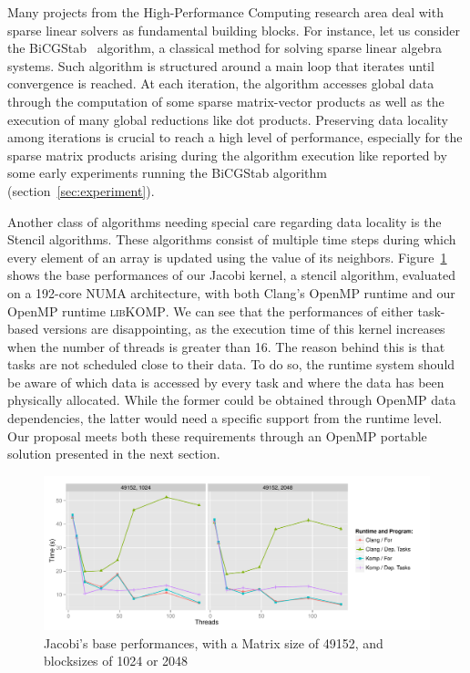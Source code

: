 \documentclass{Styles/llncs}
\newcommand{\libXKOMP}{\textsc{libKOMP}\xspace}
\begin{document}
Many projects from the High-Performance Computing research area deal with sparse linear solvers as fundamental building blocks.
For instance, let us consider the BiCGStab~\cite{Saad:2003:IMS:829576} algorithm, a classical method for solving sparse linear algebra systems.  Such algorithm is structured around a main loop that iterates until convergence is reached. At each iteration, the algorithm accesses global data through the computation of some sparse matrix-vector products as well as the execution of many global reductions like dot products. Preserving data locality among iterations is crucial to reach a high level of performance, especially for the sparse matrix products arising during the algorithm execution like reported by some early experiments running the BiCGStab algorithm (section~\ref{sec:experiment}).

Another class of algorithms needing special care regarding data locality is the Stencil algorithms.
These algorithms consist of multiple time steps during which every element of an
array is updated using the value of its neighbors. Figure~\ref{fig:eval-jacobi-before} shows
the base performances of our Jacobi kernel, a stencil algorithm, evaluated on a
192-core NUMA architecture, with both Clang's OpenMP runtime and our OpenMP runtime \libXKOMP.
We can see that the performances of either task-based versions are disappointing,
as the execution time of this kernel increases when the number of threads is greater than 16.
The reason behind this is that tasks are not scheduled close to their data.
To do so, the runtime system should be aware of which data is accessed by every task
and where the data has been physically allocated. While the former could be obtained
through OpenMP data dependencies, the latter would need a specific support from the runtime level.
Our proposal meets both these requirements through an OpenMP portable solution presented in the next section.

\begin{figure}[htbp]
  \centering
  \includegraphics[scale=0.6]{graphs/jacobi_scale_iomp_komp.pdf}
  \caption{Jacobi's base performances, with a Matrix size of 49152, and blocksizes of 1024 or 2048}
\label{fig:eval-jacobi-before}
\end{figure}
\end{document}
